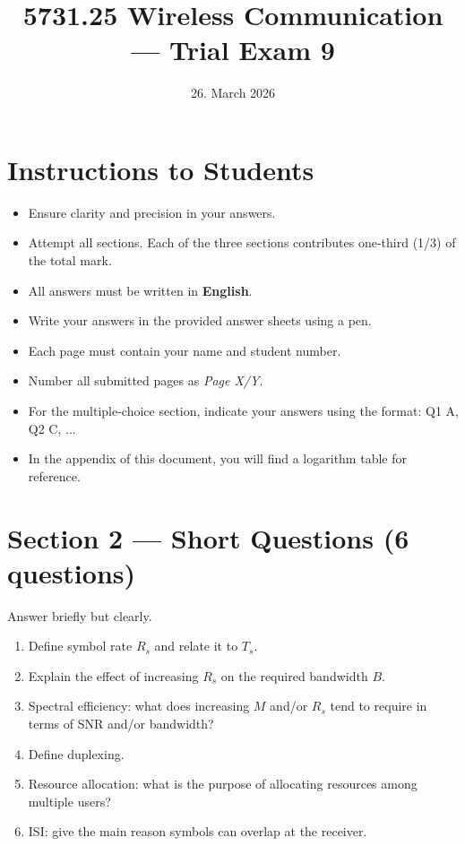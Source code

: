\documentclass[11pt,a4paper]{article}
\begin{document}
\pagestyle{fancy}
\fancyhf{}
\renewcommand{\headrulewidth}{0pt}
\renewcommand{\footrulewidth}{0pt}
\fancyfoot[R]{\thepage/\pageref{LastPage}}
\fancypagestyle{plain}{
    \fancyhf{}
    \fancyfoot[R]{\thepage/\pageref{LastPage}}
    \renewcommand{\headrulewidth}{0pt}
    \renewcommand{\footrulewidth}{0pt}
}

\title{5731.25 Wireless Communication --- Trial Exam 9}
\date{26. March 2026}
\maketitle

\section*{Instructions to Students}
\begin{itemize}
    \item Ensure clarity and precision in your answers.
    \item Attempt all sections. Each of the three sections contributes one-third (1/3) of the total mark.
    \item All answers must be written in \textbf{English}.
    \item Write your answers in the provided answer sheets using a pen.
    \item Each page must contain your name and student number.
    \item Number all submitted pages as \textit{Page X/Y}.
    \item For the multiple-choice section, indicate your answers using the format: Q1 A, Q2 C, ...
    \item In the appendix of this document, you will find a logarithm table for reference.
\end{itemize}

\newpage

\newpage

\section*{Section 2 --- Short Questions (6 questions)}
Answer briefly but clearly.

\begin{enumerate}[leftmargin=0.9cm]
\item Define symbol rate $R_s$ and relate it to $T_s$.

\item Explain the effect of increasing $R_s$ on the required bandwidth $B$.

\item Spectral efficiency: what does increasing $M$ and/or $R_s$ tend to require in terms of SNR and/or bandwidth?

\item Define duplexing.

\item Resource allocation: what is the purpose of allocating resources among multiple users?

\item ISI: give the main reason symbols can overlap at the receiver.
\end{enumerate}
\end{document}

